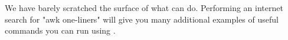 We have barely scratched the surface of what  can do.
Performing an internet search for "awk one-liners" will give you many additional examples of useful commands you can run using .

\begin{comment}
\section*{One Final Note} %
Though there are multiple Unix shells, one of the most popular is the \emph{bash} shell.
The bash shell is highly customizeable.
In your home directory, you will find a hidden file named \texttt{.bashrc}.
All customization changes are saved in this file.
If you are interested in customizing your shell, you can customize the prompt using the \li{PS1} environment variable.
As you become more and more familiar with the Unix shell, you will come to find there are commands you run over and over again.
You can save commands you use frequently using \li{alias}.
If you would like more information on these and other ways to customize the shell, you can find many quality reference guides and tutorials on the internet.
\end{comment}

